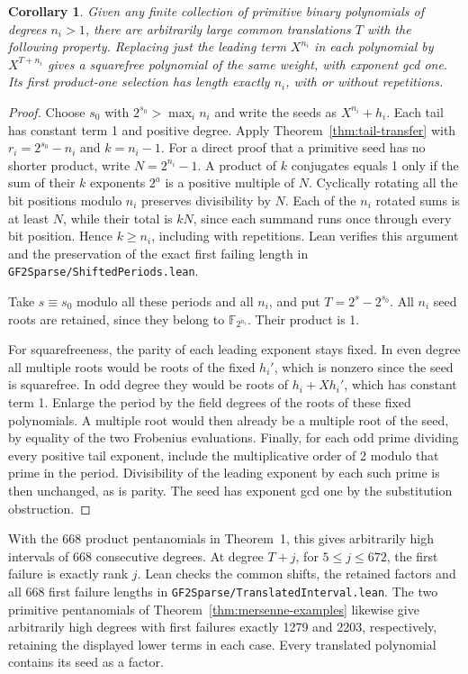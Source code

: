 \documentclass[11pt]{article}
\newtheorem{corollary}[theorem]{Corollary}
\begin{document}
\begin{corollary}\label{cor:translate-primitive-seeds}
Given any finite collection of primitive binary polynomials of degrees
\(n_i>1\), there are arbitrarily large common translations \(T\)
with the following property. Replacing just the leading term \(X^{n_i}\)
in each polynomial by \(X^{T+n_i}\) gives a squarefree polynomial
of the same weight, with exponent gcd one. Its first product-one
selection has length exactly \(n_i\), with or without repetitions.
\end{corollary}
\begin{proof}
Choose \(s_0\) with \(2^{s_0}>\max_i n_i\) and write the seeds as
\(X^{n_i}+h_i\). Each tail has constant term 1 and positive degree.
Apply Theorem~\ref{thm:tail-transfer} with \(r_i=2^{s_0}-n_i\) and
\(k=n_i-1\). For a direct proof that a primitive seed has no shorter product,
write \(N=2^{n_i}-1\). A product of \(k\) conjugates equals 1 only
if the sum of their \(k\) exponents \(2^a\) is a positive multiple
of \(N\). Cyclically rotating all the bit positions modulo \(n_i\)
preserves divisibility by \(N\). Each of the \(n_i\) rotated sums is
at least \(N\), while their total is \(kN\), since each summand runs
once through every bit position. Hence \(k\ge n_i\), including with
repetitions. Lean verifies this argument and the preservation of the
exact first failing length in \nolinkurl{GF2Sparse/ShiftedPeriods.lean}.

Take \(s\equiv s_0\) modulo all these periods and all \(n_i\), and
put \(T=2^s-2^{s_0}\). All \(n_i\) seed roots are retained, since
they belong to \(\mathbb F_{2^{n_i}}\). Their product is 1.

For squarefreeness, the parity of each leading exponent stays fixed.
In even degree all multiple roots would be roots of the fixed \(h_i'\),
which is nonzero since the seed is squarefree. In odd degree they
would be roots of \(h_i+Xh_i'\), which has constant term 1.
Enlarge the period by the field degrees of the roots of these fixed
polynomials. A multiple root would then already be a multiple root of
the seed, by equality of the two Frobenius evaluations.
Finally, for each odd prime dividing every positive tail exponent,
include the multiplicative order of 2 modulo that prime in the period.
Divisibility of the leading exponent by each such prime is then unchanged,
as is parity. The seed has exponent gcd one by the substitution obstruction.
\end{proof}

With the 668 product pentanomials in Theorem~1, this gives arbitrarily
high intervals of 668 consecutive degrees. At degree \(T+j\), for
\(5\le j\le672\), the first failure is exactly rank \(j\).
Lean checks the common shifts, the retained factors and all 668 first
failure lengths in \nolinkurl{GF2Sparse/TranslatedInterval.lean}.
The two primitive pentanomials of Theorem~\ref{thm:mersenne-examples}
likewise give arbitrarily high degrees with first failures exactly
1279 and 2203, respectively, retaining the displayed lower terms in
each case. Every translated polynomial contains its seed as a factor.
\end{document}
